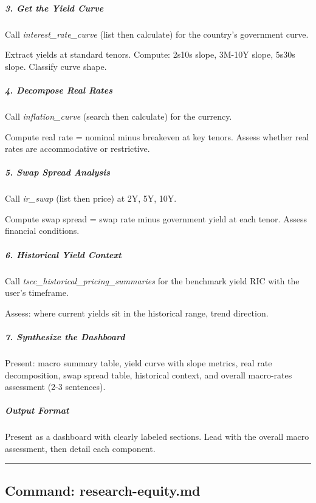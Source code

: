 \documentclass[11pt]{article}
\begin{document}
\subparagraph{3. Get the Yield Curve}\mbox{}\par

Call \emph{interest\_\allowbreak{}rate\_\allowbreak{}curve} (list then calculate) for the country's government curve.


Extract yields at standard tenors. Compute: 2s10s slope, 3M-10Y slope, 5s30s slope. Classify curve shape.


\subparagraph{4. Decompose Real Rates}\mbox{}\par

Call \emph{inflation\_\allowbreak{}curve} (search then calculate) for the currency.


Compute real rate = nominal minus breakeven at key tenors. Assess whether real rates are accommodative or restrictive.


\subparagraph{5. Swap Spread Analysis}\mbox{}\par

Call \emph{ir\_\allowbreak{}swap} (list then price) at 2Y, 5Y, 10Y.


Compute swap spread = swap rate minus government yield at each tenor. Assess financial conditions.


\subparagraph{6. Historical Yield Context}\mbox{}\par

Call \emph{tscc\_\allowbreak{}historical\_\allowbreak{}pricing\_\allowbreak{}summaries} for the benchmark yield RIC with the user's timeframe.


Assess: where current yields sit in the historical range, trend direction.


\subparagraph{7. Synthesize the Dashboard}\mbox{}\par

Present: macro summary table, yield curve with slope metrics, real rate decomposition, swap spread table, historical context, and overall macro-rates assessment (2-3 sentences).


\subparagraph{Output Format}\mbox{}\par

Present as a dashboard with clearly labeled sections. Lead with the overall macro assessment, then detail each component.


\vspace{0.8em}\hrule\vspace{0.8em}

\subsection{Command: research-equity.md}\label{file:lseg-commands-research-equity.md}
\end{document}
